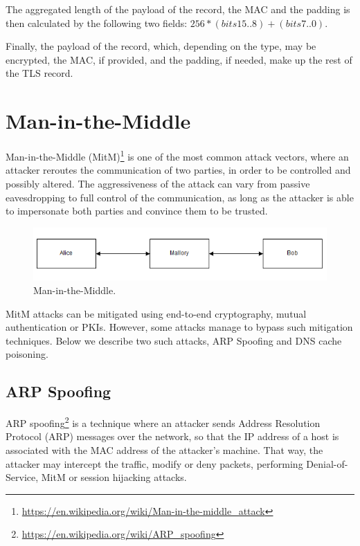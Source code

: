 The aggregated length of the payload of the record, the MAC and the padding is
then calculated by the following two fields: \begin{math}256*(bits 15..8) +
(bits 7..0)\end{math}.

Finally, the payload of the record, which, depending on the type, may be
encrypted, the MAC, if provided, and the padding, if needed, make up the rest of
the TLS record.

\section{Man-in-the-Middle}\label{sec:mitm}

Man-in-the-Middle
(MitM)\footnote{\url{https://en.wikipedia.org/wiki/Man-in-the-middle_attack}} is
one of the most common attack vectors, where an attacker reroutes the
communication of two parties, in order to be controlled and possibly altered.
The aggressiveness of the attack can vary from passive eavesdropping to full
control of the communication, as long as the attacker is able to impersonate
both parties and convince them to be trusted.

\begin{figure}[H] \caption{Man-in-the-Middle.} \centering
\includegraphics[width=1\textwidth]{diagrams/mitm.png}\end{figure}

MitM attacks can be mitigated using end-to-end cryptography, mutual
authentication or PKIs. However, some attacks manage to bypass such mitigation
techniques. Below we describe two such attacks, ARP Spoofing and DNS cache
poisoning.

\subsection{ARP Spoofing}

ARP spoofing\footnote{\url{https://en.wikipedia.org/wiki/ARP_spoofing}} is a
technique where an attacker sends Address Resolution Protocol (ARP) messages
over the network, so that the IP address of a host is associated with the MAC
address of the attacker's machine. That way, the attacker may intercept the
traffic, modify or deny packets, performing Denial-of-Service, MitM or session
hijacking attacks.

